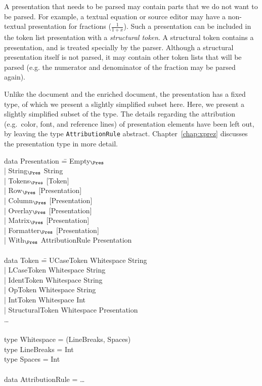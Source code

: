 A presentation that needs to be parsed may contain parts that we do not want to be parsed. For example, a textual equation or source editor may have a non-textual presentation for fractions ($\frac{1}{1+x}$). Such a presentation can be included in the token list presentation with a {\em structural token}. A structural token contains a presentation, and is treated specially by the parser. Although a structural presentation itself is not parsed, it may contain other token lists that will be parsed (e.g. the numerator and denominator of the fraction may be parsed again).

Unlike the document and the enriched document, the presentation has a fixed type, of which we present a slightly simplified subset here. Here, we present a slightly simplified subset of the type. The details regarding the attribution (e.g.\ color, font, and reference lines) of presentation elements have been left out, by leaving the type \verb|AttributionRule| abstract. Chapter~\ref{chap:xprez} discusses the presentation type in more detail.

\noindent
\ttfamily
\begin{tabbing}
data Presentation \= = Empty$_{\Pres}$\\
                  \> | String$_{\Pres}$ String \\
                  \> | Tokens$_{\Pres}$ [Token]\\
                  \> | Row$_{\Pres}$ [Presentation]\\
                  \> | Column$_{\Pres}$ [Presentation]\\
                  \> | Overlay$_{\Pres}$ [Presentation]\\
                  \> | Matrix$_{\Pres}$ [Presentation]\\
                  \> | Formatter$_{\Pres}$ [Presentation]\\
                  \> | With$_{\Pres}$ AttributionRule Presentation\\
\\
data Token \= = UCaseToken Whitespace String\\
           \> | LCaseToken Whitespace String\\
           \> | IdentToken Whitespace String\\
           \> | OpToken Whitespace String\\
           \> | IntToken Whitespace Int\\
           \> | StructuralToken Whitespace Presentation\\
           \> \dots \\
\\
type Whitespace = (LineBreaks, Spaces)\\
type LineBreaks = Int\\
type Spaces = Int\\
\\
data AttributionRule = \dots\\
\end{tabbing}
\rmfamily


